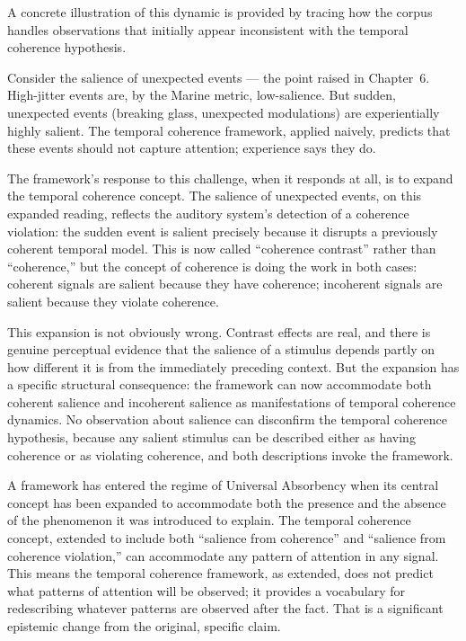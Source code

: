 A concrete illustration of this dynamic is provided by
tracing how the corpus handles observations that initially
appear inconsistent with the temporal coherence hypothesis.

Consider the salience of unexpected events --- the point
raised in Chapter~6. High-jitter events are, by the Marine
metric, low-salience. But sudden, unexpected events (breaking
glass, unexpected modulations) are experientially highly
salient. The temporal coherence framework, applied naively,
predicts that these events should not capture attention;
experience says they do.

The framework's response to this challenge, when it responds
at all, is to expand the temporal coherence concept. The
salience of unexpected events, on this expanded reading,
reflects the auditory system's detection of a coherence
violation: the sudden event is salient precisely because
it disrupts a previously coherent temporal model. This
is now called ``coherence contrast'' rather than
``coherence,'' but the concept of coherence is doing the
work in both cases: coherent signals are salient because
they have coherence; incoherent signals are salient because
they violate coherence.

This expansion is not obviously wrong. Contrast effects
are real, and there is genuine perceptual evidence that
the salience of a stimulus depends partly on how different
it is from the immediately preceding context. But the
expansion has a specific structural consequence: the
framework can now accommodate both coherent salience and
incoherent salience as manifestations of temporal coherence
dynamics. No observation about salience can disconfirm
the temporal coherence hypothesis, because any salient
stimulus can be described either as having coherence or
as violating coherence, and both descriptions invoke the
framework.

\begin{dangerzone}
A framework has entered the regime of Universal Absorbency
when its central concept has been expanded to accommodate
both the presence and the absence of the phenomenon it
was introduced to explain. The temporal coherence concept,
extended to include both ``salience from coherence'' and
``salience from coherence violation,'' can accommodate
any pattern of attention in any signal. This means the
temporal coherence framework, as extended, does not predict
what patterns of attention will be observed; it provides
a vocabulary for redescribing whatever patterns are
observed after the fact. That is a significant epistemic
change from the original, specific claim.
\end{dangerzone}

